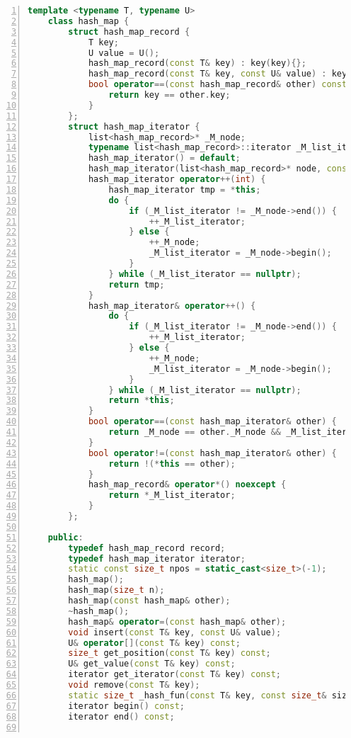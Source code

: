 \documentclass{article}
\begin{document}
\begin{lstlisting}[xleftmargin = 2em,xrightmargin = 2em, aboveskip = 0.5em, numbers = left, language = C++]
    template <typename T, typename U>
    class hash_map {
        struct hash_map_record {
            T key;
            U value = U();
            hash_map_record(const T& key) : key(key){};
            hash_map_record(const T& key, const U& value) : key(key), value(value){};
            bool operator==(const hash_map_record& other) const {
                return key == other.key;
            }
        };
        struct hash_map_iterator {
            list<hash_map_record>* _M_node;
            typename list<hash_map_record>::iterator _M_list_iterator;
            hash_map_iterator() = default;
            hash_map_iterator(list<hash_map_record>* node, const typename list<hash_map_record>::iterator& it) : _M_node(node), _M_list_iterator(it){};
            hash_map_iterator operator++(int) {
                hash_map_iterator tmp = *this;
                do {
                    if (_M_list_iterator != _M_node->end()) {
                        ++_M_list_iterator;
                    } else {
                        ++_M_node;
                        _M_list_iterator = _M_node->begin();
                    }
                } while (_M_list_iterator == nullptr);
                return tmp;
            }
            hash_map_iterator& operator++() {
                do {
                    if (_M_list_iterator != _M_node->end()) {
                        ++_M_list_iterator;
                    } else {
                        ++_M_node;
                        _M_list_iterator = _M_node->begin();
                    }
                } while (_M_list_iterator == nullptr);
                return *this;
            }
            bool operator==(const hash_map_iterator& other) {
                return _M_node == other._M_node && _M_list_iterator == _M_list_iterator;
            }
            bool operator!=(const hash_map_iterator& other) {
                return !(*this == other);
            }
            hash_map_record& operator*() noexcept {
                return *_M_list_iterator;
            }
        };

    public:
        typedef hash_map_record record;
        typedef hash_map_iterator iterator;
        static const size_t npos = static_cast<size_t>(-1);
        hash_map();
        hash_map(size_t n);
        hash_map(const hash_map& other);
        ~hash_map();
        hash_map& operator=(const hash_map& other);
        void insert(const T& key, const U& value);
        U& operator[](const T& key) const;
        size_t get_position(const T& key) const;
        U& get_value(const T& key) const;
        iterator get_iterator(const T& key) const;
        void remove(const T& key);
        static size_t _hash_fun(const T& key, const size_t& size);
        iterator begin() const;
        iterator end() const;


\end{lstlisting}
\end{document}
